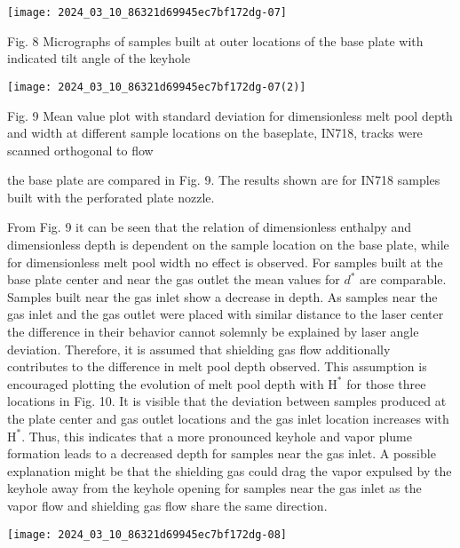 \documentclass[10pt]{article}
\begin{document}
\begin{center}
\texttt{[image: 2024\_03\_10\_86321d69945ec7bf172dg-07]}
\end{center}

Fig. 8 Micrographs of samples built at outer locations of the base plate with indicated tilt angle of the keyhole

\begin{center}
\texttt{[image: 2024\_03\_10\_86321d69945ec7bf172dg-07(2)]}
\end{center}

Fig. 9 Mean value plot with standard deviation for dimensionless melt pool depth and width at different sample locations on the baseplate, IN718, tracks were scanned orthogonal to flow

the base plate are compared in Fig. 9. The results shown are for IN718 samples built with the perforated plate nozzle.

From Fig. 9 it can be seen that the relation of dimensionless enthalpy and dimensionless depth is dependent on the sample location on the base plate, while for dimensionless melt pool width no effect is observed. For samples built at the base plate center and near the gas outlet the mean values for $d^{*}$ are comparable. Samples built near the gas inlet show a decrease in depth. As samples near the gas inlet and the gas outlet were placed with similar distance to the laser center the difference in their behavior cannot solemnly be explained by laser angle deviation. Therefore, it is assumed that shielding gas flow additionally contributes to the difference in melt pool depth observed. This assumption is encouraged plotting the evolution of melt pool depth with $\mathrm{H}^{*}$ for those three locations in Fig. 10. It is visible that the deviation between samples produced at the plate center and gas outlet locations and the gas inlet location increases with $\mathrm{H}^{*}$. Thus, this indicates that a more pronounced keyhole and vapor plume formation leads to a decreased depth for samples near the gas inlet. A possible explanation might be that the shielding gas could drag the vapor expulsed by the keyhole away from the keyhole opening for samples near the gas inlet as the vapor flow and shielding gas flow share the same direction.

\begin{center}
\texttt{[image: 2024\_03\_10\_86321d69945ec7bf172dg-08]}
\end{center}
\end{document}
